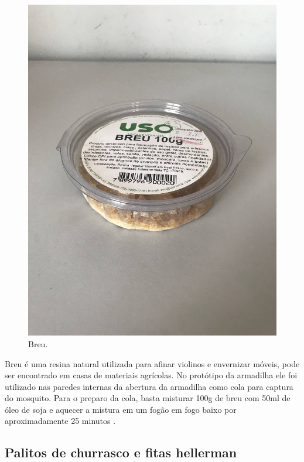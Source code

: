 \documentclass[
	12pt,				%
	openright,			%
	oneside,			%
	a4paper,			%
	chapter=TITLE,		%
	english,			%
	brazil				%
	]{abntex2}
\begin{document}
\begin{figure}[H]
    \centering
    \includegraphics[scale=0.04, angle=-90]{imagens/IMG_0601.jpg}
    \caption{Breu.}
    \label{fig:breu}
\end{figure}   

Breu é uma resina natural utilizada para afinar violinos e envernizar móveis, pode ser encontrado em casas de materiais agrícolas. 
No protótipo da armadilha ele foi utilizado nas paredes internas da abertura da armadilha como cola para captura do mosquito.
Para o preparo da cola, basta misturar 100g de breu com 50ml de óleo de soja e aquecer a mistura em um fogão em fogo baixo por
 aproximadamente 25 minutos \cite{ColaBreu}.

\subsection{Palitos de churrasco e fitas hellerman}
\end{document}
